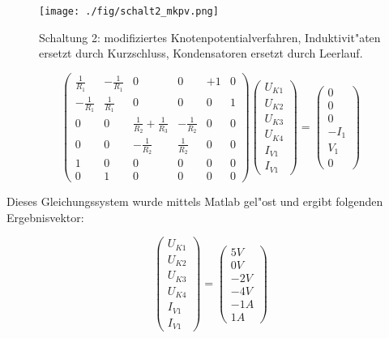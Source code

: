 \begin{figure}[h!]
 \centering
 \texttt{[image: ./fig/schalt2\_mkpv.png]}
 \caption{Schaltung 2: modifiziertes Knotenpotentialverfahren, Induktivit"aten ersetzt durch Kurzschluss, Kondensatoren ersetzt durch Leerlauf.}
 \label{fig:schalt2_mkpv}
\end{figure}



\begin{equation}
 \begin{pmatrix}\frac{1}{R_1} & -\frac{1}{R_1} & 0 & 0 & +1 & 0 \\
  -\frac{1}{R_1} & \frac{1}{R_1} & 0 & 0 & 0 & 1 \\
  0 & 0 & \frac{1}{R_2} + \frac{1}{R_3} & -\frac{1}{R_2} & 0 & 0 \\
  0 & 0 & -\frac{1}{R_2} &\frac{1}{R_2} & 0 & 0 \\
  1 & 0 & 0 & 0 & 0 & 0 \\
  0 & 1 & 0 & 0 & 0 & 0
 \end{pmatrix}
 \begin{pmatrix} U_{K1} \\ U_{K2} \\ U_{K3} \\ U_{K4} \\ I_{V1} \\ I_{V1} \end{pmatrix}
 = \begin{pmatrix} 0 \\ 0 \\ 0 \\ -I_1 \\ V_1 \\ 0 \end{pmatrix}
\end{equation}

Dieses Gleichungssystem wurde mittels Matlab gel"ost und ergibt folgenden Ergebnisvektor:

\begin{equation}
 \begin{pmatrix} U_{K1} \\ U_{K2} \\ U_{K3} \\ U_{K4} \\ I_{V1} \\ I_{V1} \end{pmatrix}
 =
 \begin{pmatrix} 5V \\ 0V \\ -2V \\ -4V \\ -1A \\ 1A \end{pmatrix}
\end{equation}

